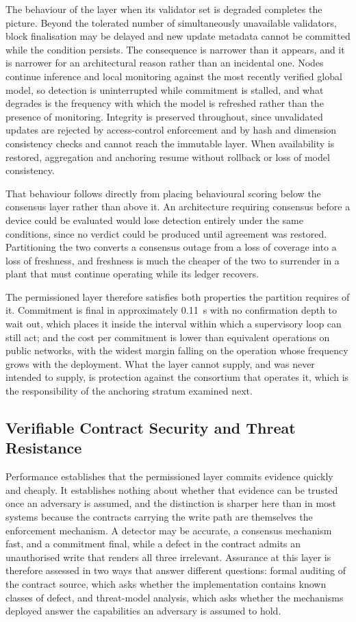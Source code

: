 The behaviour of the layer when its validator set is degraded completes the picture. Beyond the tolerated number of simultaneously unavailable validators, block finalisation may be delayed and new update metadata cannot be committed while the condition persists. The consequence is narrower than it appears, and it is narrower for an architectural reason rather than an incidental one. Nodes continue inference and local monitoring against the most recently verified global model, so detection is uninterrupted while commitment is stalled, and what degrades is the frequency with which the model is refreshed rather than the presence of monitoring. Integrity is preserved throughout, since unvalidated updates are rejected by access-control enforcement and by hash and dimension consistency checks and cannot reach the immutable layer. When availability is restored, aggregation and anchoring resume without rollback or loss of model consistency.

That behaviour follows directly from placing behavioural scoring below the consensus layer rather than above it. An architecture requiring consensus before a device could be evaluated would lose detection entirely under the same conditions, since no verdict could be produced until agreement was restored. Partitioning the two converts a consensus outage from a loss of coverage into a loss of freshness, and freshness is much the cheaper of the two to surrender in a plant that must continue operating while its ledger recovers.

The permissioned layer therefore satisfies both properties the partition requires of it. Commitment is final in approximately 0.11~s with no confirmation depth to wait out, which places it inside the interval within which a supervisory loop can still act; and the cost per commitment is lower than equivalent operations on public networks, with the widest margin falling on the operation whose frequency grows with the deployment. What the layer cannot supply, and was never intended to supply, is protection against the consortium that operates it, which is the responsibility of the anchoring stratum examined next.

\subsection{Verifiable Contract Security and Threat Resistance}
\label{sec:eval-security}
Performance establishes that the permissioned layer commits evidence quickly and cheaply. It establishes nothing about whether that evidence can be trusted once an adversary is assumed, and the distinction is sharper here than in most systems because the contracts carrying the write path are themselves the enforcement mechanism. A detector may be accurate, a consensus mechanism fast, and a commitment final, while a defect in the contract admits an unauthorised write that renders all three irrelevant. Assurance at this layer is therefore assessed in two ways that answer different questions: formal auditing of the contract source, which asks whether the implementation contains known classes of defect, and threat-model analysis, which asks whether the mechanisms deployed answer the capabilities an adversary is assumed to hold.

